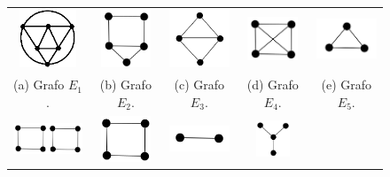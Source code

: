 \begin{figure}[htb]	
 
   \centering
  \begin{tabular}{  c c c c  c}
    \includegraphics[width=1.7cm]{img/octaedro2.png} 
    & 
    \includegraphics[width=1.5cm]{img/ex3.png} 
    & 
    \includegraphics[width=2cm]{img/diamondNoLabel.png} 
    & 
    \includegraphics[width=1.5cm]{img/k4.png} 
    & 
    \includegraphics[width=2cm]{img/k3.png} 
    \\
    \footnotesize 
    (a)  \footnotesize Grafo $E_1$. 
    & 
    \footnotesize (b) Grafo $E_2$.
    & 
    \footnotesize (c) Grafo $E_3$.
    & 
    \footnotesize (d) Grafo $E_4$.
    & 
    \footnotesize (e) Grafo $E_5$.
    \\%
        \includegraphics[width=2.5cm]{img/2c4.png} 
    & 
    \includegraphics[width=1.5cm]{img/c4e.png} 
    & 
    \includegraphics[width=1.8cm]{img/k2.png} 
    & 
    \includegraphics[width=1cm]{img/e10.png} 

\end{tabular}
\end{figure}
